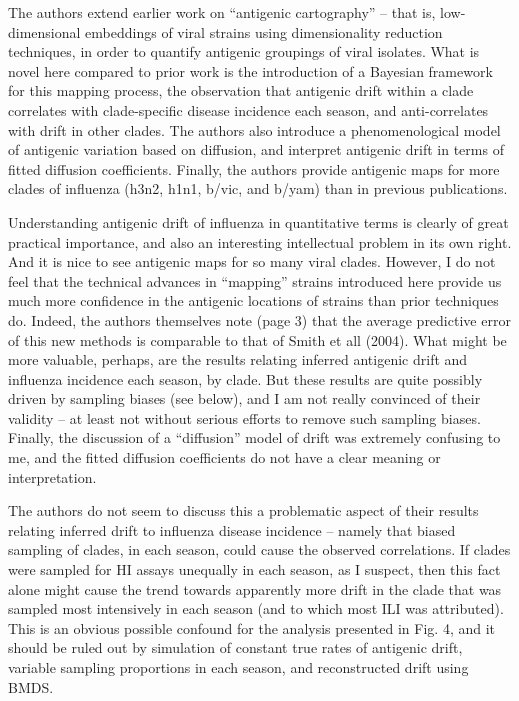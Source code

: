 \documentclass[11pt,oneside,letterpaper]{article}
\begin{document}
The authors extend earlier work on ``antigenic cartography'' -- that is, low-dimensional embeddings of viral strains using dimensionality reduction techniques, in order to quantify antigenic groupings of viral isolates. What is novel here compared to prior work is the introduction of a Bayesian framework for this mapping process, the observation that antigenic drift within a clade correlates with clade-specific disease incidence each season, and anti-correlates with drift in other clades. The authors also introduce a phenomenological model of antigenic variation based on diffusion, and interpret antigenic drift in terms of fitted diffusion coefficients. Finally, the authors provide antigenic maps for more clades of influenza (h3n2, h1n1, b/vic, and b/yam) than in previous publications.

Understanding antigenic drift of influenza in quantitative terms is clearly of great practical importance, and also an interesting intellectual problem in its own right. And it is nice to see antigenic maps for so many viral clades. However, I do not feel that the technical advances in ``mapping'' strains introduced here provide us much more confidence in the antigenic locations of strains than prior techniques do. Indeed, the authors themselves note (page 3) that the average predictive error of this new methods is comparable to that of Smith et all (2004). What might be more valuable, perhaps, are the results relating inferred antigenic drift and influenza incidence each season, by clade. But these results are quite possibly driven by sampling biases (see below), and I am not really convinced of their validity -- at least not without serious efforts to remove such sampling biases. Finally, the discussion of a ``diffusion'' model of drift was extremely confusing to me, and the fitted diffusion coefficients do not have a clear meaning or interpretation.

The authors do not seem to discuss this a problematic aspect of their results relating inferred drift to influenza disease incidence -- namely that biased sampling of clades, in each season, could cause the observed correlations. If clades were sampled for HI assays unequally in each season, as I suspect, then this fact alone might cause the trend towards apparently more drift in the clade that was sampled most intensively in each season (and to which most ILI was attributed). This is an obvious possible confound for the analysis presented in Fig. 4, and it should be ruled out by simulation of constant true rates of antigenic drift, variable sampling proportions in each season, and reconstructed drift using BMDS.
\end{document}
